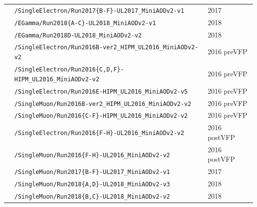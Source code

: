 \begin{table}
\begin{tabular}{p{3.1cm}p{11.3cm}p{2.8cm}}
\hline
{}
& \texttt{/SingleElectron/Run2017\{B-F\}-UL2017\_MiniAODv2-v1} & 2017 \\
& \texttt{/EGamma/Run2018\{A-C\}-UL2018\_MiniAODv2-v1} & 2018 \\
& \texttt{/EGamma/Run2018D-UL2018\_MiniAODv2-v2} & 2018 \\
\hline
{}
& \texttt{/SingleElectron/Run2016B-ver2\_HIPM\_UL2016\_MiniAODv2-v2} & 2016 preVFP \\
& \texttt{/SingleElectron/Run2016\{C,D,F\}-HIPM\_UL2016\_MiniAODv2-v2} & 2016 preVFP \\
& \texttt{/SingleElectron/Run2016E-HIPM\_UL2016\_MiniAODv2-v5} & 2016 preVFP \\
& \texttt{/SingleMuon/Run2016B-ver2\_HIPM\_UL2016\_MiniAODv2-v2} & 2016 preVFP \\
& \texttt{/SingleMuon/Run2016\{C-F\}-HIPM\_UL2016\_MiniAODv2-v2} & 2016 preVFP \\
& \texttt{/SingleElectron/Run2016\{F-H\}-UL2016\_MiniAODv2-v2} & 2016 postVFP \\
& \texttt{/SingleMuon/Run2016\{F-H\}-UL2016\_MiniAODv2-v2} & 2016 postVFP \\
& \texttt{/SingleMuon/Run2017\{B-F\}-UL2017\_MiniAODv2-v1} & 2017 \\
& \texttt{/SingleMuon/Run2018\{A,D\}-UL2018\_MiniAODv2-v3} & 2018 \\
& \texttt{/SingleMuon/Run2018\{B,C\}-UL2018\_MiniAODv2-v2} & 2018 \\
\hline
\hline
\end{tabular}
\end{table}

